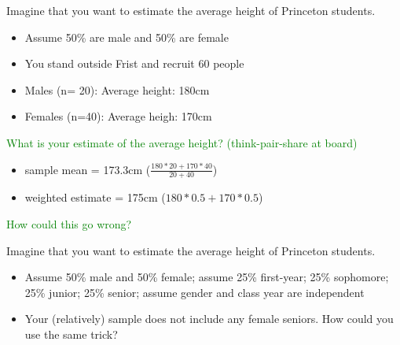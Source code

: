 \documentclass[aspectratio=169]{beamer}
\begin{document}
\begin{frame}

Imagine that you want to estimate the average height of Princeton students.\\
\begin{itemize}
\item Assume 50\% are male and 50\% are female
\item You stand outside Frist and recruit 60 people
\item Males (n= 20): Average height: 180cm
\item Females (n=40): Average heigh: 170cm
\end{itemize}
\textcolor{green}{What is your estimate of the average height? (think-pair-share at board)}

\end{frame}
\begin{frame}

\begin{itemize}
\item sample mean = 173.3cm ($\frac{180 * 20 + 170 * 40}{20 + 40}$)
\pause
\item weighted estimate = 175cm ($180 * 0.5 + 170 * 0.5$)
\end{itemize}
\pause
\textcolor{green}{How could this go wrong?}

\end{frame}
\begin{frame}

Imagine that you want to estimate the average height of Princeton students.\\
\begin{itemize}
\item Assume 50\% male and 50\% female; assume 25\% first-year; 25\% sophomore; 25\% junior; 25\% senior; assume gender and class year are independent
\item Your (relatively) sample does not include any female seniors.  How could you use the same trick?
\end{itemize}

\end{frame}
\end{document}
